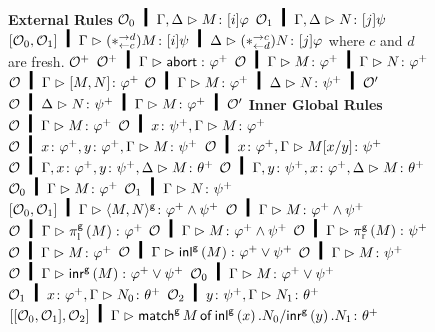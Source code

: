 {\begin{figure}[p]
 \small
\centering
\textbf{External Rules}
\vskip 2mm
\BinaryRule
   {$\hypert_0\hmid\Gamma,\Delta\tr\tj{M}{[i]\varphi}$}
   {$\hypert_1\hmid\Gamma,\Delta\tr\tj{N}{[j]\psi}$}
   {}
   {$\cotuple{\hypert_0,\hypert_1}\hmid\Gamma\tr\tj{(\comodL)M}{[i]\psi}\hmid
   \Delta\tr\tj{(\comodR)N}{[j]\varphi}$}
   where $c$ and $d$ are fresh.
\vskip 2mm
 \UnaryRule
 {$\mathcal{O}^+$}
 {}
 {$\hypert^+\hmid\Gamma\tr \tj \abort {\m\varphi}$}
\vskip 2mm
 \UnaryRule
 {$\hypert\hmid\Gamma\tr\tj M {\m\varphi}\hmid\Gamma\tr \tj N {\m\varphi}$}
 {}
 {$\hypert\hmid\Gamma\tr \tj {\cotuple{M,N}}{\m\varphi}$}
\hfill
 \UnaryRule
 {$\hypert\hmid\Gamma\tr M\colon\m\varphi\hmid\Delta\tr N\colon \m\psi\hmid \hypert'$}
 {}
 {$\hypert\hmid\Delta\tr N\colon\m\psi   \hmid\Gamma\tr M\colon \m\varphi\hmid \hypert'$}
 \vskip 2mm
\textbf{Inner Global Rules}
   \vskip 2mm
   \UnaryRule
   {$\hypert\hmid \Gamma\tr\tj M {\m\varphi}$}
   {}
   {$\hypert\hmid \tj x {\m\psi}, \Gamma\tr \tj{M}{\m\varphi}$}
   \hfill
   \UnaryRule
   {$\hypert\hmid \tj{x}{\m\varphi}, \tj{y}{\m\varphi}, \Gamma\tr \tj
   M{\m\psi}$}
   {}
   {$\hypert \hmid \tj{x}{\m\varphi}, \Gamma\tr \tj{M[x/y]}{\m\psi}$}
\vskip 2mm
\UnaryRule
   {$\hypert\hmid\Gamma,\tj x{\m\varphi},\tj y{\m\psi},\Delta\tr
   \tj M{\m\theta}$}{}
   {$\hypert\hmid\Gamma,\tj y{\m\psi},\tj x{\m\varphi},\Delta\tr \tj M{\m\theta}$} %
\hfill
\BinaryRule
   {$\hypert_0\hmid\Gamma\tr \tj M{\m\varphi}$}
   {$\hypert_1\hmid\Gamma\tr \tj N{\m\psi}$}
   {}
   {$\cotuple{\hypert_0,\hypert_1}\hmid\Gamma\tr
     \tj{\gpair{M,N}}{\m\varphi\wedge\m\psi}$}
   \vskip 2mm
  \UnaryRule
   {$\hypert\hmid\Gamma\tr M\colon\m\varphi\wedge\m\psi$}
   {}
   {$\hypert\hmid\Gamma\tr \gpil{M}\colon\m\varphi$}
   \hfill
  \UnaryRule
   {$\hypert\hmid\Gamma\tr M\colon\m\varphi\wedge\m\psi$}
   {}
   {$\hypert\hmid\Gamma\tr\gpir M\colon\m\psi$}
\vskip 2mm
  \UnaryRule
   {$\hypert\hmid\Gamma\tr M\colon\m\varphi$}
   {}
   {$\hypert\hmid\Gamma\tr\ginl{M}\colon\m\varphi\vee\m\psi$}
   \hfill
  \UnaryRule
   {$\hypert\hmid\Gamma\tr M\colon\m\psi$}
   {}
   {$\hypert\hmid\Gamma\tr \ginr{M}\colon\m\varphi\vee\m\psi$}
\vskip 2mm
\TrinaryRule
   {$\hypert_0\hmid\Gamma\tr \tj M {\m\varphi\vee\m\psi}$}
   {$\hypert_1\hmid\tj x{\m\varphi},\Gamma\tr \tj {N_0}{\m\theta}$}
   {$\hypert_2\hmid\tj y{\m\psi},   \Gamma\tr \tj {N_1}{\m\theta}$}
   {}
   {$\cotuple{\cotuple{\hypert_0,\hypert_1},\hypert_2}\hmid\Gamma \tr \tj{\gmat M x {N_0} y {N_1}}{\m\theta}$}

\end{figure}}
